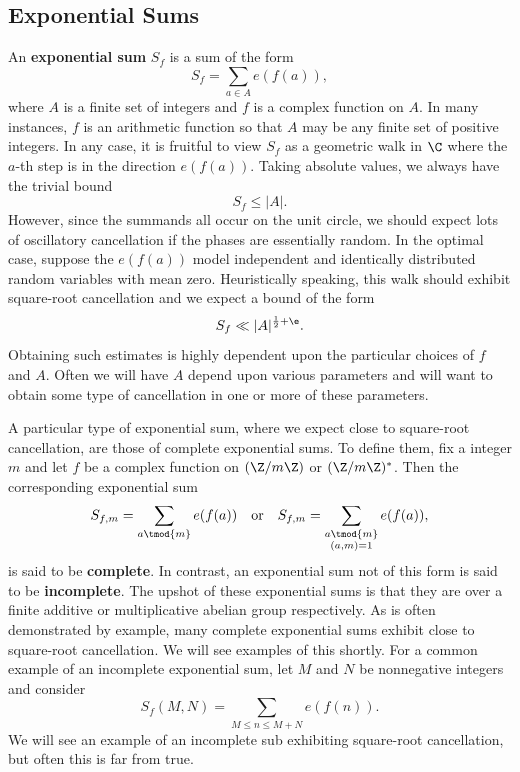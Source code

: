 \documentclass[12pt]{article}
\begin{document}
    \subsection{Exponential Sums}
      An \textbf{exponential sum} \(S_{f}\) is a sum of the form
      \[
        S_{f} = \sum_{a \in A}e(f(a)),
      \]
      where \(A\) is a finite set of integers and \(f\) is a complex function on \(A\). In many instances, \(f\) is an arithmetic function so that \(A\) may be any finite set of positive integers. In any case, it is fruitful to view \(S_{f}\) as a geometric walk in \(\C\) where the \(a\)-th step is in the direction \(e(f(a))\). Taking absolute values, we always have the trivial bound
      \[
        S_{f} \le |A|.
      \]
      However, since the summands all occur on the unit circle, we should expect lots of oscillatory cancellation if the phases are essentially random. In the optimal case, suppose the \(e(f(a))\) model independent and identically distributed random variables with mean zero. Heuristically speaking, this walk should exhibit square-root cancellation and we expect a bound of the form
      \[
        S_{f} \ll |A|^{\frac{1}{2}+\e}.
      \]
      Obtaining such estimates is highly dependent upon the particular choices of \(f\) and \(A\). Often we will have \(A\) depend upon various parameters and will want to obtain some type of cancellation in one or more of these parameters.
      
      A particular type of exponential sum, where we expect close to square-root cancellation, are those of complete exponential sums. To define them, fix a integer \(m\) and let \(f\) be a complex function on \((\Z/m\Z)\) or \((\Z/m\Z)^{\ast}\). Then the corresponding exponential sum
      \[
        S_{f,m} = \sum_{a \tmod{m}}e(f(a)) \quad \text{or} \quad S_{f,m} = \sum_{\substack{a \tmod{m} \\ (a,m) = 1}}e(f(a)),
      \]
      is said to be \textbf{complete}. In contrast, an exponential sum not of this form is said to be \textbf{incomplete}. The upshot of these exponential sums is that they are over a finite additive or multiplicative abelian group respectively. As is often demonstrated by example, many complete exponential sums exhibit close to square-root cancellation. We will see examples of this shortly. For a common example of an incomplete exponential sum, let \(M\) and \(N\) be nonnegative integers and consider
      \[
        S_{f}(M,N) = \sum_{M \le n \le M+N}e(f(n)).
      \]
      We will see an example of an incomplete sub exhibiting square-root cancellation, but often this is far from true.
\end{document}
